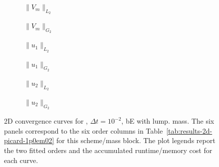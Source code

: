 \begin{figure}[p]
\centering
\begin{subfigure}{0.485\linewidth}
\centering
{}
\caption{$\|V_m\|_{L_2}$}
\label{fig:results-2d-picard-1p0em02-backwardeuler-lumped-a}
\end{subfigure}
\hfill
\begin{subfigure}{0.485\linewidth}
\centering
{}
\caption{$\|V_m\|_{G_2}$}
\label{fig:results-2d-picard-1p0em02-backwardeuler-lumped-b}
\end{subfigure}
\par\vspace{0.8em}
\begin{subfigure}{0.485\linewidth}
\centering
{}
\caption{$\|u_1\|_{L_2}$}
\label{fig:results-2d-picard-1p0em02-backwardeuler-lumped-c}
\end{subfigure}
\hfill
\begin{subfigure}{0.485\linewidth}
\centering
{}
\caption{$\|u_1\|_{G_2}$}
\label{fig:results-2d-picard-1p0em02-backwardeuler-lumped-d}
\end{subfigure}
\par\vspace{0.8em}
\begin{subfigure}{0.485\linewidth}
\centering
{}
\caption{$\|u_2\|_{L_2}$}
\label{fig:results-2d-picard-1p0em02-backwardeuler-lumped-e}
\end{subfigure}
\hfill
\begin{subfigure}{0.485\linewidth}
\centering
{}
\caption{$\|u_2\|_{G_2}$}
\label{fig:results-2d-picard-1p0em02-backwardeuler-lumped-f}
\end{subfigure}
\caption{2D convergence curves for , $\Delta t=10^{-2}$, bE with lump. mass. The six panels correspond to the six order columns in Table~\ref{tab:results-2d-picard-1p0em02} for this scheme/mass block. The plot legends report the two fitted orders and the accumulated runtime/memory cost for each curve.}
\label{fig:results-2d-picard-1p0em02-backwardeuler-lumped}
\end{figure}
\FloatBarrier

